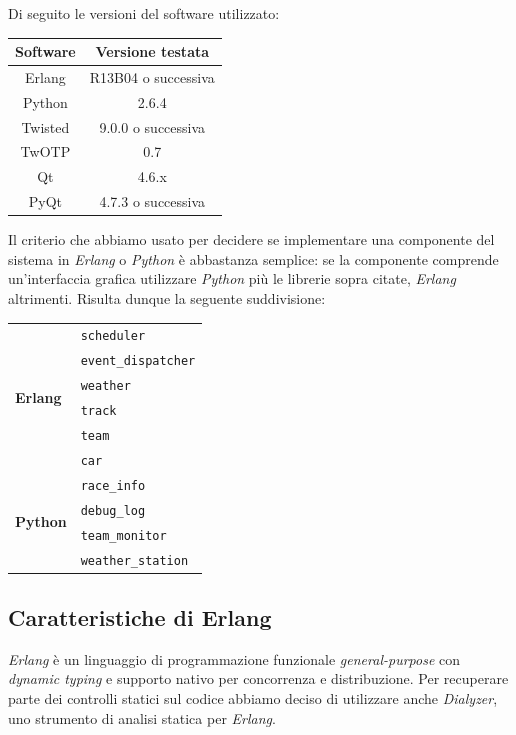 \documentclass[a4paper]{report}
\newcommand{\Erlang}{\textsl{Erlang}}
\newcommand{\Python}{\textsl{Python}}
\begin{document}
Di seguito le versioni del software utilizzato:
\begin{center}
\begin{tabular}{c|c}
\textbf{Software} & \textbf{Versione testata} \\
\hline
Erlang & R13B04 o successiva \\
\hline
Python & 2.6.4 \\
\hline
Twisted & 9.0.0 o successiva \\
TwOTP & 0.7 \\
\hline
Qt & 4.6.x \\
PyQt & 4.7.3 o successiva \\
\end{tabular}
\end{center}

Il criterio che abbiamo usato per decidere se implementare una componente del sistema in \Erlang{} o \Python{} è abbastanza semplice: se la componente comprende un'interfaccia grafica utilizzare \Python{} più le librerie sopra citate, \Erlang{} altrimenti. Risulta dunque la seguente suddivisione:
\begin{center}
\begin{tabular}{|p{}|p{}|}
\hline
\multirow{6}{*}{\textbf{Erlang}} & \texttt{scheduler}\\
& \texttt{event\_dispatcher}\\
& \texttt{weather}\\
& \texttt{track}\\
& \texttt{team}\\
& \texttt{car} \\
\hline
\multirow{4}{*}{\textbf{Python}} & \texttt{race\_info}\\
& \texttt{debug\_log}\\
& \texttt{team\_monitor}\\
& \texttt{weather\_station}\\
\hline
\end{tabular}
\end{center}

\subsection*{Caratteristiche di Erlang}
\Erlang{} è un linguaggio di programmazione funzionale \textit{general-purpose} con \textit{dynamic typing} e supporto nativo per concorrenza e distribuzione. Per recuperare parte dei controlli statici sul codice abbiamo deciso di utilizzare anche \textsl{Dialyzer}, uno strumento di analisi statica per \Erlang{}.
\end{document}
